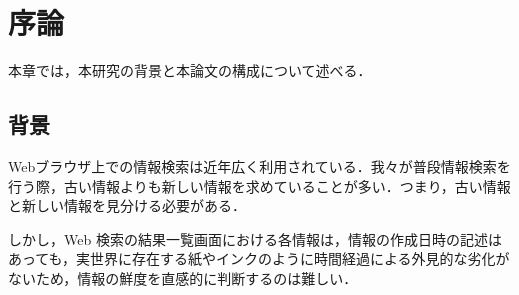 \chapter{序論}
\label{chap:introduction}

本章では，本研究の背景と本論文の構成について述べる．

\newpage

\section{背景}

Webブラウザ上での情報検索は近年広く利用されている．我々が普段情報検索を行う際，古い情報よりも新しい情報を求めていることが多い．つまり，古い情報と新しい情報を見分ける必要がある．

しかし，Web 検索の結果一覧画面における各情報は，情報の作成日時の記述はあっても，実世界に存在する紙やインクのように時間経過による外見的な劣化がないため，情報の鮮度を直感的に判断するのは難しい．

